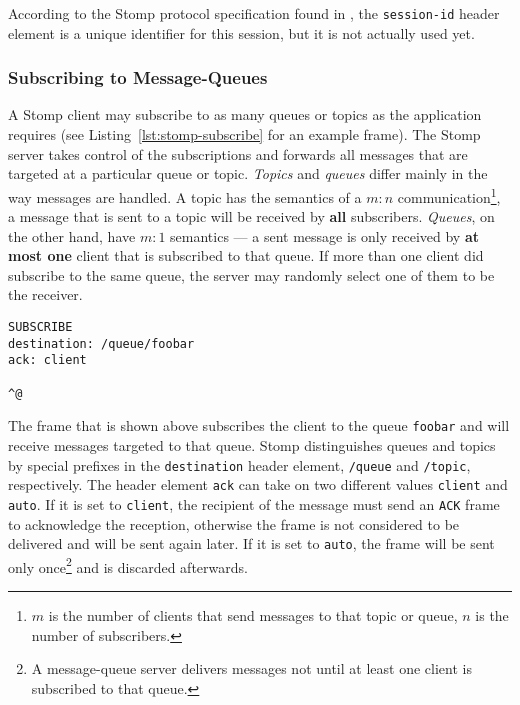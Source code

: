 According to  the Stomp protocol specification found  in \cite{stomp}, the
\texttt{session-id}  header  element  is  a  unique  identifier  for  this
session, but it is not actually used yet.

\subsubsection{Subscribing to Message-Queues}

A  Stomp  client  may  subscribe  to  as many  queues  or  topics  as  the
application requires (see Listing~\ref{lst:stomp-subscribe} for an example
frame). The Stomp  server takes control of the  subscriptions and forwards
all   messages   that   are    targeted   at   a   particular   queue   or
topic. \emph{Topics}  and \emph{queues} differ mainly in  the way messages
are    handled.    A    topic    has   the    semantics    of   a    $m:n$
communication\footnote{$m$ is the number  of clients that send messages to
  that topic or  queue, $n$ is the number of  subscribers.}, \ie a message
that   is   sent  to   a   topic   will   be  received   by   \textbf{all}
subscribers. \emph{Queues}, on the other  hand, have $m:1$ semantics --- a
sent  message is  only received  by \textbf{at  most one}  client  that is
subscribed to  that queue.  If more  than one client did  subscribe to the
same queue, the server may randomly select one of them to be the receiver.

\medskip
\begin{center}
  \begin{minipage}{.75\textwidth}
    \begin{lstlisting}[captionpos=b,backgroundcolor=\color{listingcolor},frame=lines,numbers=none,stepnumber=5,numberfirstline=false,numberstyle=\tiny,caption={The
        \texttt{SUBSCRIBE} frame used for queue or topic subscription.},label={lst:stomp-subscribe}]
SUBSCRIBE
destination: /queue/foobar
ack: client

^@
    \end{lstlisting}
  \end{minipage}
\end{center}

The  frame  that  is  shown  above  subscribes the  client  to  the  queue
\texttt{foobar} and  will receive messages  targeted to that  queue. Stomp
distinguishes   queues   and   topics   by   special   prefixes   in   the
\texttt{destination}    header    element,    \ie   \texttt{/queue}    and
\texttt{/topic}, respectively. The header element \texttt{ack} can take on
two different  values \texttt{client} and  \texttt{auto}. If it is  set to
\texttt{client}, the  recipient of the  message must send  an \texttt{ACK}
frame to acknowledge the reception,  otherwise the frame is not considered
to  be  delivered  and  will  be  sent  again later.   If  it  is  set  to
\texttt{auto}, the  frame will be sent  only once\footnote{A message-queue
  server delivers messages not until  at least one client is subscribed to
  that queue.}  and is discarded afterwards.

